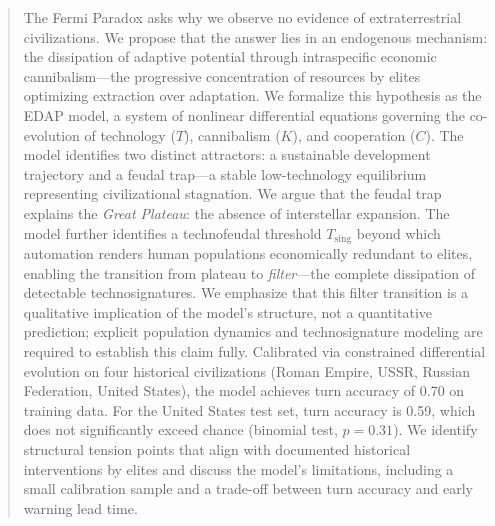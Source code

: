 \begin{abstract}
The Fermi Paradox asks why we observe no evidence of extraterrestrial civilizations. We propose that the answer lies in an endogenous mechanism: the dissipation of adaptive potential through intraspecific economic cannibalism---the progressive concentration of resources by elites optimizing extraction over adaptation. We formalize this hypothesis as the EDAP model, a system of nonlinear differential equations governing the co-evolution of technology ($T$), cannibalism ($K$), and cooperation ($C$). The model identifies two distinct attractors: a sustainable development trajectory and a feudal trap---a stable low-technology equilibrium representing civilizational stagnation. We argue that the feudal trap explains the \emph{Great Plateau}: the absence of interstellar expansion. The model further identifies a technofeudal threshold $T_{\text{sing}}$ beyond which automation renders human populations economically redundant to elites, enabling the transition from plateau to \emph{filter}---the complete dissipation of detectable technosignatures. We emphasize that this filter transition is a qualitative implication of the model's structure, not a quantitative prediction; explicit population dynamics and technosignature modeling are required to establish this claim fully. Calibrated via constrained differential evolution on four historical civilizations (Roman Empire, USSR, Russian Federation, United States), the model achieves turn accuracy of 0.70 on training data. For the United States test set, turn accuracy is 0.59, which does not significantly exceed chance (binomial test, $p = 0.31$). We identify structural tension points that align with documented historical interventions by elites and discuss the model's limitations, including a small calibration sample and a trade-off between turn accuracy and early warning lead time.
\end{abstract}
